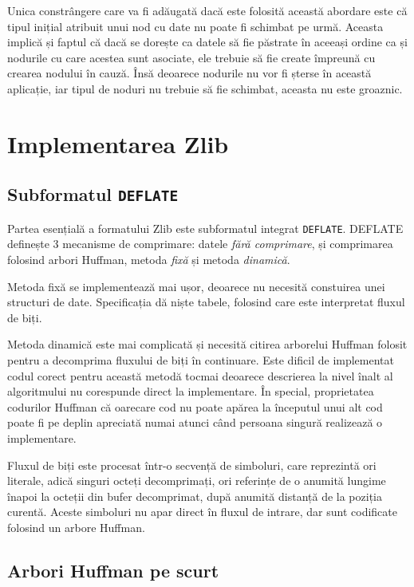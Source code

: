 \documentclass[a4paper,12pt]{report}
\begin{document}
Unica constrângere care va fi adăugată dacă este folosită această abordare este că
tipul inițial atribuit unui nod cu date nu poate fi schimbat pe urmă.
Aceasta implică și faptul că dacă se dorește ca datele să fie păstrate în aceeași ordine ca și
nodurile cu care acestea sunt asociate, ele trebuie să fie create împreună cu crearea nodului în cauză.
Însă deoarece nodurile nu vor fi șterse în această aplicație,
iar tipul de noduri nu trebuie să fie schimbat, aceasta nu este groaznic.


\section{Implementarea Zlib}

\subsection{Subformatul \texttt{DEFLATE}}

Partea esențială a formatului Zlib este subformatul integrat \texttt{DEFLATE}.
DEFLATE definește 3 mecanisme de comprimare: datele \textit{fără comprimare},
și comprimarea folosind arbori Huffman, metoda \textit{fixă} și metoda \textit{dinamică}.

Metoda fixă se implementează mai ușor, deoarece nu necesită constuirea unei structuri de date.
Specificația dă niște tabele, folosind care este interpretat fluxul de biți.

Metoda dinamică este mai complicată și necesită citirea arborelui Huffman
folosit pentru a decomprima fluxului de biți în continuare.
Este dificil de implementat codul corect pentru această metodă tocmai deoarece descrierea
la nivel înalt al algoritmului nu corespunde direct la implementare.
În special, proprietatea codurilor Huffman că oarecare cod nu poate apărea
la începutul unui alt cod poate fi pe deplin apreciată numai atunci
când persoana singură realizează o implementare.

Fluxul de biți este procesat într-o secvență de simboluri,
care reprezintă ori literale, adică singuri octeți decomprimați,
ori referințe de o anumită lungime înapoi la octeții din bufer decomprimat,
după anumită distanță de la poziția curentă.
Aceste simboluri nu apar direct în fluxul de intrare,
dar sunt codificate folosind un arbore Huffman.

\subsection{Arbori Huffman pe scurt}
\end{document}
